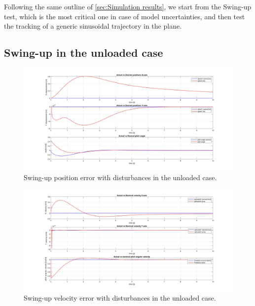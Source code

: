 Following the same outline of \cref{sec:Simulation results}, we start from the Swing-up test, which is the most critical one in case of model uncertainties, and then test the tracking of a generic sinusoidal trajectory in the plane.

\subsection{Swing-up in the unloaded case}
\label{subsec:Swing-up in the unloaded case}

\begin{figure}
    \centering
    \includegraphics[width=1\linewidth]{Images/Robustness analysis/Unloaded/Swing-Up/Position_error.jpg}
    \caption{Swing-up position error with disturbances in the unloaded case.}
    \label{fig:Swing-up position error with disturbances in the unloaded case}
\end{figure}

\begin{figure}
    \centering
    \includegraphics[width=1\linewidth]{Images/Robustness analysis/Unloaded/Swing-Up/Velocity_error.jpg}
    \caption{Swing-up velocity error with disturbances in the unloaded case.}
    \label{fig:Swing-up velocity error with disturbances in the unloaded case}
\end{figure}


